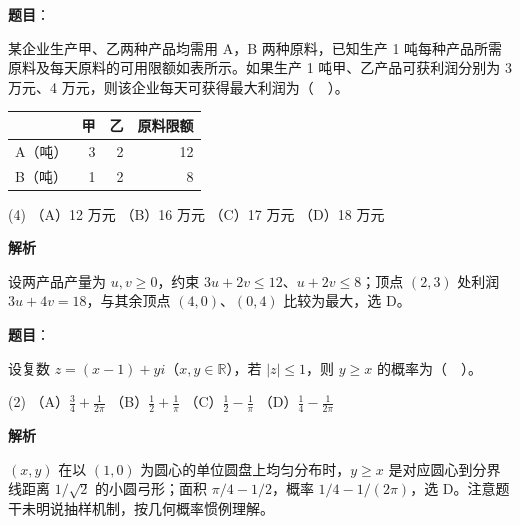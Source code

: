 \begin{answer}

\textbf{题目}：

某企业生产甲、乙两种产品均需用 A，B 两种原料，已知生产 1 吨每种产品所需原料及每天原料的可用限额如表所示。如果生产 1 吨甲、乙产品可获利润分别为 3 万元、4 万元，则该企业每天可获得最大利润为（　）。

\begin{center}
\begin{tabular}{lrrr}
\toprule
 & 甲 & 乙 & 原料限额 \\
\midrule
A（吨） & 3 & 2 & 12 \\
B（吨） & 1 & 2 & 8 \\
\bottomrule
\end{tabular}
\end{center}

\begin{gkopts}(4)
\task （A）12 万元
\task （B）16 万元
\task （C）17 万元
\task （D）18 万元
\end{gkopts}

\textbf{解析}

设两产品产量为 $u,v\geq0$，约束 $3u+2v\le12$、$u+2v\le8$；顶点 $(2,3)$ 处利润 $3u+4v=18$，与其余顶点 $(4,0)$、$(0,4)$ 比较为最大，选 D。


\end{answer}
\begin{answer}

\textbf{题目}：

设复数 $z=(x-1)+yi$（$x,y\in\mathbb R$），若 $|z|\leq1$，则 $y\geq x$ 的概率为（　）。

\begin{gkopts}(2)
\task （A）$\frac34+\frac1{2\pi}$
\task （B）$\frac12+\frac1\pi$
\task （C）$\frac12-\frac1\pi$
\task （D）$\frac14-\frac1{2\pi}$
\end{gkopts}

\textbf{解析}

$(x,y)$ 在以 $(1,0)$ 为圆心的单位圆盘上均匀分布时，$y\ge x$ 是对应圆心到分界线距离 $1/\sqrt2$ 的小圆弓形；面积 $\pi/4-1/2$，概率 $1/4-1/(2\pi)$，选 D。注意题干未明说抽样机制，按几何概率惯例理解。


\end{answer}
